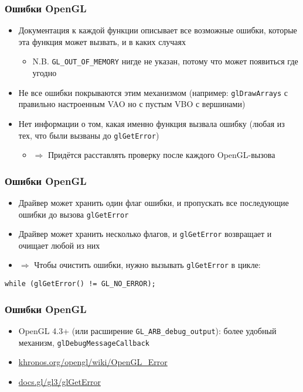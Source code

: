 \documentclass{beamer}
\begin{document}
\begin{frame}[fragile]
\frametitle{Ошибки OpenGL}
\begin{itemize}
\item Документация к каждой функции описывает все возможные ошибки, которые эта функция может вызвать, и в каких случаях
\pause
\begin{itemize}
\item N.B. \verb|GL_OUT_OF_MEMORY| нигде не указан, потому что может появиться где угодно
\end{itemize}
\pause
\item Не все ошибки покрываются этим механизмом (например: \verb|glDrawArrays| с правильно настроенным VAO но с пустым VBO с вершинами)
\pause
\item Нет информации о том, какая именно функция вызвала ошибку (любая из тех, что были вызваны до \verb|glGetError|)
\pause
\begin{itemize}
\item \begin{math}\Rightarrow\end{math} Придётся расставлять проверку после каждого OpenGL-вызова
\end{itemize}
\end{itemize}
\end{frame}

\begin{frame}[fragile]
\frametitle{Ошибки OpenGL}
\begin{itemize}
\item Драйвер может хранить один флаг ошибки, и пропускать все последующие ошибки до вызова \verb|glGetError|
\pause
\item Драйвер может хранить несколько флагов, и \verb|glGetError| возвращает и очищает любой из них
\pause
\item \begin{math}\Rightarrow\end{math} Чтобы очистить ошибки, нужно вызывать \verb|glGetError| в цикле:
\end{itemize}
\begin{verbatim}
while (glGetError() != GL_NO_ERROR);
\end{verbatim}
\end{frame}

\begin{frame}[fragile]
\frametitle{Ошибки OpenGL}
\begin{itemize}
\item OpenGL 4.3+ (или расширение \verb|GL_ARB_debug_output|): более удобный механизм, \verb|glDebugMessageCallback|
\pause
\item \href{https://www.khronos.org/opengl/wiki/OpenGL_Error}{khronos.org/opengl/wiki/OpenGL\_Error}
\item \href{https://docs.gl/gl3/glGetError}{docs.gl/gl3/glGetError}
\end{itemize}
\end{frame}
\end{document}
